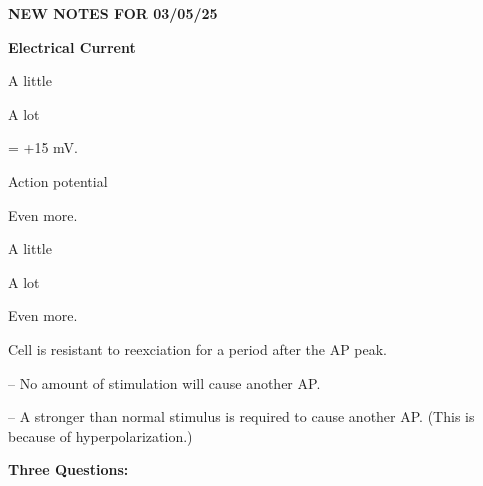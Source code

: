 \begin{coloredlist}
\begin{coloredlist}
        \begin{center}
            \textbf{NEW NOTES FOR 03/05/25} \\
            \hrulefill
        \end{center}
        \item \textbf{Electrical Current}
        \begin{coloredlist}
            \item {}
            \begin{coloredlist}
                \item A little 
                \item A lot
                \begin{coloredlist}
                    \item {} = +15 mV.
                    \item Action potential
                \end{coloredlist}
                \item Even more.
            \end{coloredlist}
            \item {}
            \begin{coloredlist}
                \item A little
                \item A lot
                \item Even more.
            \end{coloredlist}
        \end{coloredlist}
        \item {}
        \begin{coloredlist}
            \item Cell is resistant to reexciation for a period after the AP peak.
            \begin{coloredlist}
                \item {} -- No amount of stimulation will cause another AP.
                \item {} -- A stronger than normal stimulus is required to cause another AP. (This is because of hyperpolarization.)
            \end{coloredlist}
        \end{coloredlist}
        \item \textbf{Three Questions:}
        \begin{coloredlist}

\end{coloredlist}
\end{coloredlist}
\end{coloredlist}
